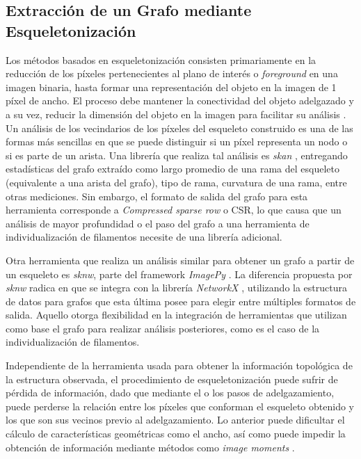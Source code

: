 \subsection{Extracci\'on de un Grafo mediante Esqueletonizaci\'on}
\label{subsec:infoLossSkel}
Los m\'etodos basados en esqueletonizaci\'on consisten primariamente en la reducci\'on de los p\'ixeles pertenecientes al plano de inter\'es o {\it foreground} en una imagen binaria, hasta formar una representaci\'on del objeto en la imagen de 1 p\'ixel de ancho. El proceso debe mantener la conectividad del objeto adelgazado y a su vez, reducir la dimensi\'on del objeto en la imagen para facilitar su an\'alisis   . Un an\'alisis de los vecindarios de los p\'ixeles del esqueleto construido es una de las formas m\'as sencillas en que se puede distinguir si un p\'ixel representa un nodo o si es parte de un arista. Una librer\'ia que realiza tal an\'alisis es {\it skan} , entregando estad\'isticas del grafo extra\'ido como largo promedio de una rama del esqueleto (equivalente a una arista del grafo), tipo de rama, curvatura de una rama, entre otras mediciones. Sin embargo, el formato de salida del grafo para esta herramienta corresponde a {\it Compressed sparse row} o CSR, lo que causa que un an\'alisis de mayor profundidad o el paso del grafo a una herramienta de individualizaci\'on de filamentos necesite de una librer\'ia adicional. 


Otra herramienta que realiza un an\'alisis similar para obtener un grafo a partir de un esqueleto es {\it sknw}, parte del framework {\it ImagePy} . La diferencia propuesta por {\it sknw} radica en que se integra con la librer\'ia {\it NetworkX} , utilizando la estructura de datos para grafos que esta \'ultima posee para elegir entre m\'ultiples formatos de salida. Aquello otorga flexibilidad en la integraci\'on de herramientas que utilizan como base el grafo para realizar an\'alisis posteriores, como es el caso de la individualizaci\'on de filamentos.


Independiente de la herramienta usada para obtener la informaci\'on topol\'ogica de la estructura observada, el procedimiento de esqueletonizaci\'on puede sufrir de p\'erdida de informaci\'on, dado que mediante el o los pasos de adelgazamiento, puede perderse la relaci\'on entre los p\'ixeles que conforman el esqueleto obtenido y los que son sus vecinos previo al adelgazamiento. Lo anterior puede dificultar el c\'alculo de caracter\'isticas geom\'etricas como el ancho, as\'i como puede impedir la obtenci\'on de informaci\'on mediante m\'etodos como {\it image moments} .

